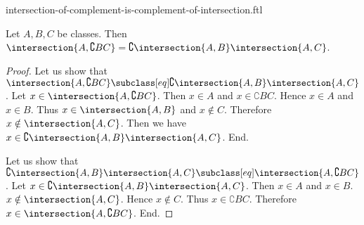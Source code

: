 \documentclass{article}
\begin{document}
\begin{smodule}[creators={Marcel Schütz}]{intersection-of-complement-is-complement-of-intersection.ftl}

  \begin{fproposition*}[label=5672367154003968]
    Let $A, B, C$ be classes.
    Then $\intersection{A,\complement{B}{C}} = \complement{\intersection{A,B}}{\intersection{A,C}}$.
  \end{fproposition*}
  \begin{proof}
    Let us show that $\intersection{A,\complement{B}{C}} \subclass[eq] \complement{\intersection{A,B}}{\intersection{A,C}}$.
      Let $x \in \intersection{A,\complement{B}{C}}$.
      Then $x \in A$ and $x \in \complement{B}{C}$.
      Hence $x \in A$ and $x \in B$.
      Thus $x \in \intersection{A,B}$ and $x \notin C$.
      Therefore $x \notin \intersection{A,C}$.
      Then we have $x \in \complement{\intersection{A,B}}{\intersection{A,C}}$.
    End.

    Let us show that $\complement{\intersection{A,B}}{\intersection{A,C}} \subclass[eq] \intersection{A,\complement{B}{C}}$.
      Let $x \in \complement{\intersection{A,B}}{\intersection{A,C}}$.
      Then $x \in A$ and $x \in B$.
      $x \notin \intersection{A,C}$.
      Hence $x \notin C$.
      Thus $x \in \complement{B}{C}$.
      Therefore $x \in \intersection{A,\complement{B}{C}}$.
    End.
  \end{proof}
\end{smodule}
\end{document}

